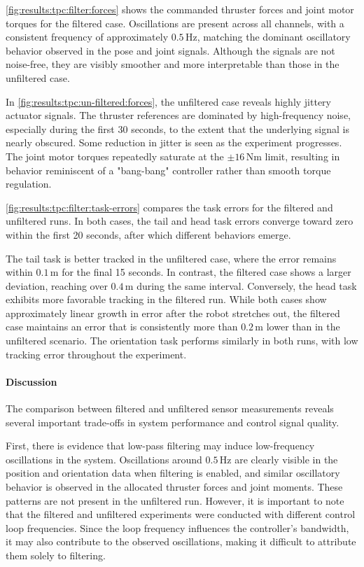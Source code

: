 \autoref{fig:results:tpc:filter:forces} shows the commanded thruster forces and joint motor torques for the filtered case. Oscillations are present across all channels, with a consistent frequency of approximately \(0.5\,\mathrm{Hz}\), matching the dominant oscillatory behavior observed in the pose and joint signals. Although the signals are not noise-free, they are visibly smoother and more interpretable than those in the unfiltered case.

In \autoref{fig:results:tpc:un-filtered:forces}, the unfiltered case reveals highly jittery actuator signals. The thruster references are dominated by high-frequency noise, especially during the first 30 seconds, to the extent that the underlying signal is nearly obscured. Some reduction in jitter is seen as the experiment progresses. The joint motor torques repeatedly saturate at the \(\pm 16\,\mathrm{Nm}\) limit, resulting in behavior reminiscent of a "bang-bang" controller rather than smooth torque regulation.

\autoref{fig:results:tpc:filter:task-errors} compares the task errors for the filtered and unfiltered runs. In both cases, the tail and head task errors converge toward zero within the first 20 seconds, after which different behaviors emerge.

The tail task is better tracked in the unfiltered case, where the error remains within \(0.1\,\mathrm{m}\) for the final 15 seconds. In contrast, the filtered case shows a larger deviation, reaching over \(0.4\,\mathrm{m}\) during the same interval. Conversely, the head task exhibits more favorable tracking in the filtered run. While both cases show approximately linear growth in error after the robot stretches out, the filtered case maintains an error that is consistently more than \(0.2\,\mathrm{m}\) lower than in the unfiltered scenario.
The orientation task performs similarly in both runs, with low tracking error throughout the experiment.


\paragraph{Discussion}
The comparison between filtered and unfiltered sensor measurements reveals several important trade-offs in system performance and control signal quality.

First, there is evidence that low-pass filtering may induce low-frequency oscillations in the system. Oscillations around \(0.5\,\mathrm{Hz}\) are clearly visible in the position and orientation data when filtering is enabled, and similar oscillatory behavior is observed in the allocated thruster forces and joint moments. These patterns are not present in the unfiltered run. However, it is important to note that the filtered and unfiltered experiments were conducted with different control loop frequencies. Since the loop frequency influences the controller's bandwidth, it may also contribute to the observed oscillations, making it difficult to attribute them solely to filtering.

